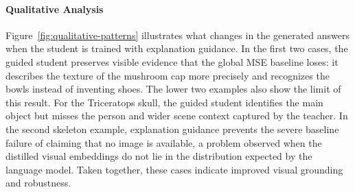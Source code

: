


\paragraph{Qualitative Analysis}
\label{sec:qualitative}

Figure~\ref{fig:qualitative-patterns} illustrates what changes in the generated answers when the student is trained with explanation guidance.
In the first two cases, the guided student preserves visible evidence that the global MSE baseline loses: it describes the texture of the mushroom cap more precisely and recognizes the bowls instead of inventing shoes. The lower two examples also show the limit of this result. For the Triceratops skull, the guided student identifies the main object but misses the person and wider scene context captured by the teacher. In the second skeleton example, explanation guidance prevents the severe baseline failure of claiming that no image is available, a problem observed when the distilled visual embeddings do not lie in the distribution expected by the language model. Taken together, these cases indicate improved visual grounding and robustness.


